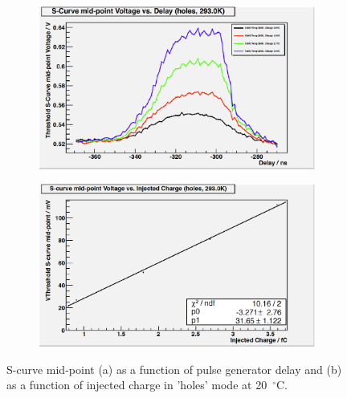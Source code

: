 \begin{figure}[hbtp]
   \centering
   \begin{subfigure}[h]{0.5\textwidth}%
   	 \centering
   	 \includegraphics[width=\textwidth]{Chapters/07_Appendices/07c_2_Images/scurve_midpoint_v_pg_delay_holes_20deg}
   	 \caption{}
   	 \label{subfig:scurve_midpoint_v_pg_delay_holes_20deg}
   \end{subfigure}
   \begin{subfigure}[h]{0.5\textwidth} %
   	 \centering
   	 \includegraphics[width=\textwidth]{Chapters/07_Appendices/07c_2_Images/scurve_midpoint_v_injected_charge_holes_20deg}\hfill
   	 \caption{}
   	 \label{subfig:scurve_midpoint_v_injected_charge_holes_20deg}
   \end{subfigure}
     \caption{S-curve mid-point (a) as a function of pulse generator delay and (b) as a function of injected
     charge in 'holes' mode at 20~$^{\circ}$C.}
     \label{fig:midpoint_v_delay_and_charge_holes_20deg}
\end{figure}

